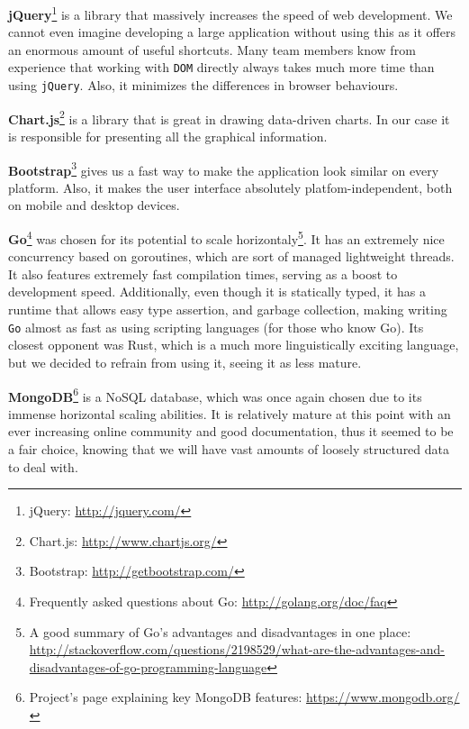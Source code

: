 \documentclass{l3proj}
\begin{document}
\textbf{jQuery}\footnote{\raggedright{}jQuery: \url{http://jquery.com/}} is a library that massively increases the speed of web development. We cannot even imagine developing a large application without using this as it offers an enormous amount of useful shortcuts. Many team members know from experience that working with \texttt{DOM} directly always takes much more time than using \texttt{jQuery}. Also, it minimizes the differences in browser behaviours.

\textbf{Chart.js}\footnote{\raggedright{}Chart.js: \url{http://www.chartjs.org/}} is a library that is great in drawing data-driven charts. In our case it is responsible for presenting all the graphical information.

\textbf{Bootstrap}\footnote{\raggedright{}Bootstrap: \url{http://getbootstrap.com/}} gives us a fast way to make the application look similar on every platform. Also, it makes the user interface absolutely platfom-independent, both on mobile and desktop devices.

\textbf{Go}\footnote{\raggedright{}Frequently asked questions about Go: \url{http://golang.org/doc/faq}} was chosen for its potential to scale horizontaly\footnote{\raggedright{}A good summary of Go's advantages and disadvantages in one place: \url{http://stackoverflow.com/questions/2198529/what-are-the-advantages-and-disadvantages-of-go-programming-language}}. It has an extremely nice concurrency based on goroutines, which are sort of managed lightweight threads. It also features extremely fast compilation times, serving as a boost to development speed. Additionally, even though it is statically typed, it has a runtime that allows easy type assertion, and garbage collection, making writing \texttt{Go} almost as fast as using scripting languages (for those who know Go). Its closest opponent was Rust, which is a much more linguistically exciting language, but we decided to refrain from using it, seeing it as less mature.

\textbf{MongoDB}\footnote{\raggedright{Project's page explaining key MongoDB features: \url{https://www.mongodb.org/}}} is a NoSQL database, which was once again chosen due to its immense horizontal scaling abilities. It is relatively mature at this point with an ever increasing online community and good documentation, thus it seemed to be a fair choice, knowing that we will have vast amounts of loosely structured data to deal with.

\end{document}
